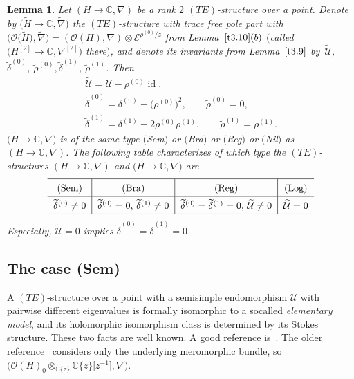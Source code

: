 \documentclass[10pt,a4paper]{amsart}
\numberwithin{equation}{section}
\numberwithin{figure}{section}
\newcommand{\C}{{\mathbb C}}
\newcommand{\EE}{{\mathcal E}}
\newcommand{\OO}{{\mathcal O}}
\newcommand{\UU}{{\mathcal U}}
\newcommand{\www}{\widetilde}
\newcommand{\nnn}{\nabla}
\DeclareMathOperator{\id}{id}
\newtheorem{Lemma}[Theorem]{Lemma}
\begin{document}
\begin{Lemma}\label{t4.3}
Let $(H\to\C,\nnn)$ be a rank $2$ $(TE)$-structure over a point.
Denote by $\big(\www H\to\C,\www\nnn\big)$ the $(TE)$-structure
with trace free pole part with
$\big(\OO\big(\www H\big),\www\nnn\big)=(\OO(H),\nnn)\otimes\EE^{\rho^{(0)}/z}$
from Lemma~$\ref{t3.10}(b)$
$\big($called $\big(H^{[2]}\to\C,\nnn^{[2]}\big)$ there$\big)$,
and denote its invariants from Lemma~$\ref{t3.9}$
by~$\www\UU$,~$\www\delta^{(0)}$, $\www\rho^{(0)},
\www\delta^{(1)}$, $\www\rho^{(1)}$. Then
\begin{gather*}%
\www\UU= \UU-\rho^{(0)}\id,
\\
\www\delta^{(0)}= \delta^{(0)}-\big(\rho^{(0)}\big)^2,\qquad
\www\rho^{(0)}=0,\nonumber
\\
\www\delta^{(1)}= \delta^{(1)}-2\rho^{(0)}\rho^{(1)},\qquad
\www\rho^{(1)}=\rho^{(1)}.
\end{gather*}
$\big(\www H\to\C,\www\nnn\big)$ is of the same type $($Sem$)$ or $($Bra$)$
or $($Reg$)$ or $($Nil$)$ as $(H\to\C,\nnn)$.
The following table characterizes of which type the
$(TE)$-structures $(H\to\C,\nnn)$ and
$\big(\www H\to\C,\www\nnn\big)$ are
\[
\def\arraystretch{1.5}
\begin{tabular}{c|c|c|c}
\hline
$($Sem$)$ & $($Bra$)$ &$($Reg$)$ &$($Log$)$
\\ \hline
$\www\delta^{(0)}\neq 0$ & $\www\delta^{(0)}=0$, $\www\delta^{(1)}\neq 0$
&$\www\delta^{(0)}=\www \delta^{(1)}=0$, $\www\UU\neq 0$ & $\www\UU=0$
\\
\hline
\end{tabular}
\]
Especially, $\www\UU=0$ implies $\www\delta^{(0)}=
\www\delta^{(1)}=0$.
\end{Lemma}



\subsection{The case (Sem)}%


A $(TE)$-structure over a point with a semisimple
endomorphism $\UU$ with pairwise different eigenvalues
is formally isomorphic to a socalled {\it elementary model},
and its holomorphic isomorphism class is determined
by its Stokes structure. These two facts are well known.
A good reference is~\cite[Chapter~II, Sections~5 and~6]{Sa02}.
The older reference~\cite{Ma83a} considers only
the underlying meromorphic bundle, so
$\big(\OO(H)_0\otimes_{\C\{z\}}\C\{z\}\big[z^{-1}\big],\nnn\big)$.
\end{document}
